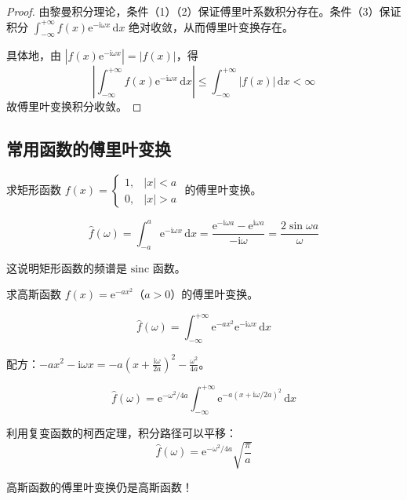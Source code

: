 \begin{proof}
由黎曼积分理论，条件（1）（2）保证傅里叶系数积分存在。条件（3）保证积分 $\int_{-\infty}^{+\infty} f(x)\mathrm{e}^{-\mathrm{i}\omega x}\,\mathrm{d}x$ 绝对收敛，从而傅里叶变换存在。

具体地，由 $|f(x)\mathrm{e}^{-\mathrm{i}\omega x}| = |f(x)|$，得
\begin{equation}
    \left|\int_{-\infty}^{+\infty} f(x)\mathrm{e}^{-\mathrm{i}\omega x}\,\mathrm{d}x\right| \leq \int_{-\infty}^{+\infty} |f(x)|\,\mathrm{d}x < \infty
\end{equation}
故傅里叶变换积分收敛。
\end{proof}
\subsection{常用函数的傅里叶变换}

\begin{lizi}{}{}
求矩形函数 $f(x) = \begin{cases} 1, & |x| < a \\ 0, & |x| > a \end{cases}$ 的傅里叶变换。

\begin{jie}
    \begin{equation}
        \hat{f}(\omega) = \int_{-a}^{a} \mathrm{e}^{-\mathrm{i}\omega x}\,\mathrm{d}x = \frac{\mathrm{e}^{-\mathrm{i}\omega a} - \mathrm{e}^{\mathrm{i}\omega a}}{-\mathrm{i}\omega} = \frac{2\sin\omega a}{\omega}
    \end{equation}
    
    这说明矩形函数的频谱是 $\mathrm{sinc}$ 函数。
\end{jie}
\end{lizi}

\begin{lizi}{}{}
求高斯函数 $f(x) = \mathrm{e}^{-ax^2}$（$a > 0$）的傅里叶变换。

\begin{jie}
    \begin{equation}
        \hat{f}(\omega) = \int_{-\infty}^{+\infty} \mathrm{e}^{-ax^2}\mathrm{e}^{-\mathrm{i}\omega x}\,\mathrm{d}x
    \end{equation}
    
    配方：$-ax^2 - \mathrm{i}\omega x = -a(x + \frac{\mathrm{i}\omega}{2a})^2 - \frac{\omega^2}{4a}$。
    
    \begin{equation}
        \hat{f}(\omega) = \mathrm{e}^{-\omega^2/4a}\int_{-\infty}^{+\infty} \mathrm{e}^{-a(x + \mathrm{i}\omega/2a)^2}\,\mathrm{d}x
    \end{equation}
    
    利用复变函数的柯西定理，积分路径可以平移：
    \begin{equation}
        \hat{f}(\omega) = \mathrm{e}^{-\omega^2/4a}\sqrt{\frac{\pi}{a}}
    \end{equation}
    
    高斯函数的傅里叶变换仍是高斯函数！
\end{jie}
\end{lizi}

